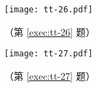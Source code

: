 \begin{question}[resume]
  \begin{figure}
    \begin{minipage}[b]{0.65\linewidth}\centering
      \texttt{[image: tt-26.pdf]}
      \caption*{（第 \ref{exec:tt-26} 题）}
    \end{minipage}
    \begin{minipage}[b]{0.3\linewidth}\centering
      \texttt{[image: tt-27.pdf]}
      \caption*{（第 \ref{exec:tt-27} 题）}
    \end{minipage}
  \end{figure}
\end{question}